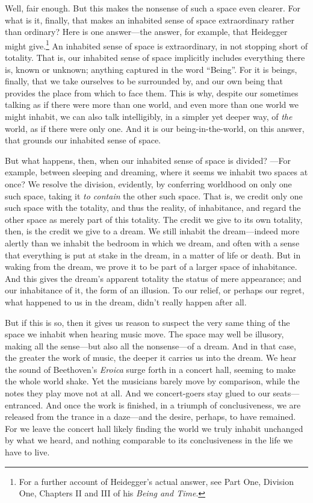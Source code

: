 \documentclass[12pt]{memoir}
\begin{document}
Well, fair enough. But this makes the nonsense of such a space even
clearer. For what is it, finally, that makes an inhabited sense of space
extraordinary rather than ordinary? Here is one answer---the answer, for
example, that Heidegger might give.\footnote{For a further account of
  Heidegger's actual answer, see Part One, Division One, Chapters II and
  III of his \emph{Being and Time}.} An inhabited sense of space is
extraordinary, in not stopping short of totality. That is, our inhabited
sense of space implicitly includes everything there is, known or
unknown; anything captured in the word ``Being''. For it is beings,
finally, that we take ourselves to be surrounded by, and our own being
that provides the place from which to face them. This is why, despite
our sometimes talking as if there were more than one world, and even
more than one world we might inhabit, we can also talk intelligibly, in
a simpler yet deeper way, of \emph{the} world, as if there were only
one. And it is our being-in-the-world, on this answer, that grounds our
inhabited sense of space.

But what happens, then, when our inhabited sense of space is divided?
---For example, between sleeping and dreaming, where it seems we inhabit
two spaces at once? We resolve the division, evidently, by conferring
worldhood on only one such space, taking it \emph{to contain} the other
such space. That is, we credit only one such space with the totality,
and thus the reality, of inhabitance, and regard the other space as
merely part of this totality. The credit we give to its own totality,
then, is the credit we give to a dream. We still inhabit the
dream---indeed more alertly than we inhabit the bedroom in which we
dream, and often with a sense that everything is put at stake in the
dream, in a matter of life or death. But in waking from the dream, we
prove it to be part of a larger space of inhabitance. And this gives the
dream's apparent totality the status of mere appearance; and our
inhabitance of it, the form of an illusion. To our relief, or perhaps
our regret, what happened to us in the dream, didn't really happen after
all.

But if this is so, then it gives us reason to suspect the very same
thing of the space we inhabit when hearing music move. The space may
well be illusory, making all the sense---but also all the nonsense---of
a dream. And in that case, the greater the work of music, the deeper it
carries us into the dream. We hear the sound of Beethoven's
\emph{Eroica} surge forth in a concert hall, seeming to make the
whole world shake. Yet the musicians barely move by comparison, while the
notes they play move not at all. And we concert-goers stay glued to our
seats---entranced. And once the work is finished, in a triumph of
conclusiveness, we are released from the trance in a daze---and the
desire, perhaps, to have remained. For we leave the concert hall likely
finding the world we truly inhabit unchanged by what we heard, and
nothing comparable to its conclusiveness in the life we have to live.
\end{document}
